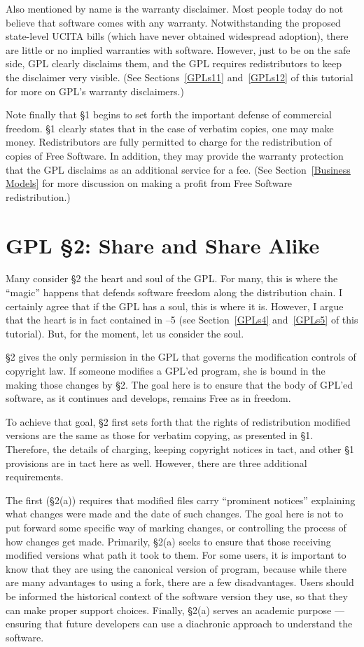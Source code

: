 \documentclass[12pt]{report}
\begin{document}
Also mentioned by name is the warranty disclaimer.  Most people today do
not believe that software comes with any warranty.  Notwithstanding the
proposed state-level UCITA bills (which have never obtained widespread
adoption), there are little or no implied warranties with software.
However, just to be on the safe side, GPL clearly disclaims them, and the
GPL requires redistributors to keep the disclaimer very visible.  (See
Sections~\ref{GPLs11} and~\ref{GPLs12} of this tutorial for more on GPL's
warranty disclaimers.)

Note finally that \S 1 begins to set forth the important defense of
commercial freedom.  \S 1 clearly states that in the case of verbatim
copies, one may make money.  Redistributors are fully permitted to charge
for the redistribution of copies of Free Software.  In addition, they may
provide the warranty protection that the GPL disclaims as an additional
service for a fee.  (See Section~\ref{Business Models} for more discussion
on making a profit from Free Software redistribution.)

\section{GPL \S 2: Share and Share Alike}

Many consider \S 2 the heart and soul of the GPL\@.  For many, this is
where the ``magic'' happens that defends software freedom along the
distribution chain.  I certainly agree that if the GPL has a soul, this is
where it is.  However, I argue that the heart is in fact contained in --5 (see Section~\ref{GPLs4} and~\ref{GPLs5} of this tutorial).  But, for
the moment, let us consider the soul.

\S 2 gives the only permission in the GPL that governs the modification
controls of copyright law.  If someone modifies a GPL'ed program, she is
bound in the making those changes by \S 2.  The goal here is to ensure
that the body of GPL'ed software, as it continues and develops, remains
Free as in freedom.

To achieve that goal, \S 2 first sets forth that the rights of
redistribution modified versions are the same as those for verbatim
copying, as presented in \S 1.  Therefore, the details of charging,
keeping copyright notices in tact, and other \S 1 provisions are in tact
here as well.  However, there are three additional requirements.

The first (\S 2(a)) requires that modified files carry ``prominent
notices'' explaining what changes were made and the date of such changes.
The goal here is not to put forward some specific way of marking changes,
or controlling the process of how changes get made.  Primarily, \S 2(a)
seeks to ensure that those receiving modified versions what path it took
to them.  For some users, it is important to know that they are using the
canonical version of program, because while there are many advantages to
using a fork, there are a few disadvantages.  Users should be informed the
historical context of the software version they use, so that they can make
proper support choices.  Finally, \S 2(a) serves an academic purpose ---
ensuring that future developers can use a diachronic approach to
understand the software.
\end{document}
